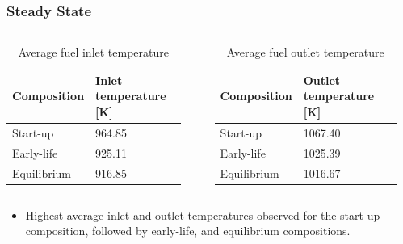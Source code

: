 \begin{frame}
	\frametitle{Steady State}
		\begin{columns}
			\column[t]{5cm}
			\begin{table}[b]
				\small
				\centering
				\caption{Average fuel inlet temperature}
				\begin{tabular}{ll}
					\hline
					{Composition} & {Inlet temperature [K]}\\
					\hline
					Start-up & 964.85\\
					Early-life & 925.11\\
					Equilibrium & 916.85\\
					\hline
				\end{tabular}
				\label{table:inlet}
			\end{table}
			\column[t]{5cm}
			\begin{table}[b]
				\small
				\centering
				\caption{Average fuel outlet temperature}
				\begin{tabular}{ll}
					\hline
					{Composition} & {Outlet temperature [K]}\\
					\hline
					Start-up & 1067.40\\
					Early-life & 1025.39\\
					Equilibrium & 1016.67\\
					\hline
				\end{tabular}
				\label{table:outlet}
			\end{table}	
		\end{columns}
		
		\vspace{.3cm}
		\begin{itemize}
		\item Highest average inlet and outlet temperatures observed for the
		start-up composition, followed by early-life, and equilibrium
		compositions.
		\end{itemize}
\end{frame}

